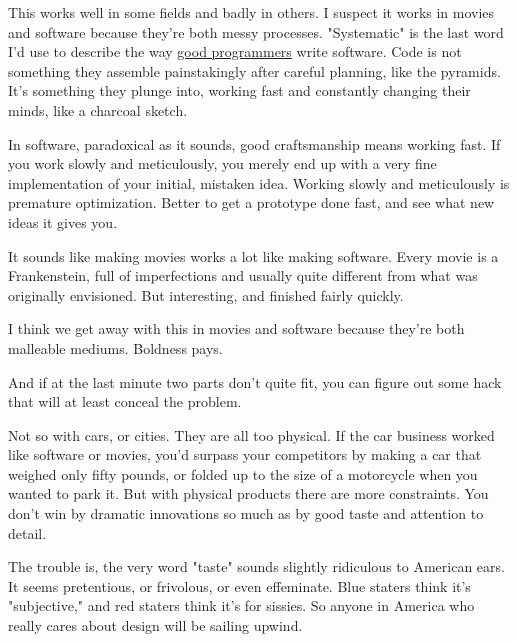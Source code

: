 This
                  works well in some fields and badly in others. I suspect it
                  works in movies and software because they're both messy
                  processes. "Systematic" is the last word I'd use to describe
                  the way \href{http://www.paulgraham.com/gh.html}{good programmers} write software.
                  Code is not something they assemble painstakingly after
                  careful planning, like the pyramids. It's something they
                  plunge into, working fast and constantly changing their minds,
                  like a charcoal sketch.

In software, paradoxical as
                  it sounds, good craftsmanship means working fast. If you work
                  slowly and meticulously, you merely end up with a very fine
                  implementation of your initial, mistaken idea. Working slowly
                  and meticulously is premature optimization. Better to get a
                  prototype done fast, and see what new ideas it gives you.

It
                  sounds like making movies works a lot like making software.
                  Every movie is a Frankenstein, full of imperfections and
                  usually quite different from what was originally envisioned.
                  But interesting, and finished fairly quickly.
                  

I think we get away
                  with this in movies and software because they're both
                  malleable mediums. Boldness pays.
                  
                  And if at the last minute two parts don't quite fit, you can
                  figure out some hack that will at least conceal the
                  problem.

Not so with cars, or cities. They are all
                  too physical. If the car business worked like software or
                  movies, you'd surpass your competitors by making a car that
                  weighed only fifty pounds, or folded up to the size of a
                  motorcycle when you wanted to park it. But with physical
                  products there are more constraints. You don't win by dramatic
                  innovations so much as by good taste and attention to
                  detail.

The trouble is, the very word "taste"
                  sounds slightly ridiculous to American ears. It seems
                  pretentious, or frivolous, or even effeminate. Blue staters
                  think it's "subjective," and red staters think it's for
                  sissies. So anyone in America who really cares about design
                  will be sailing upwind.




